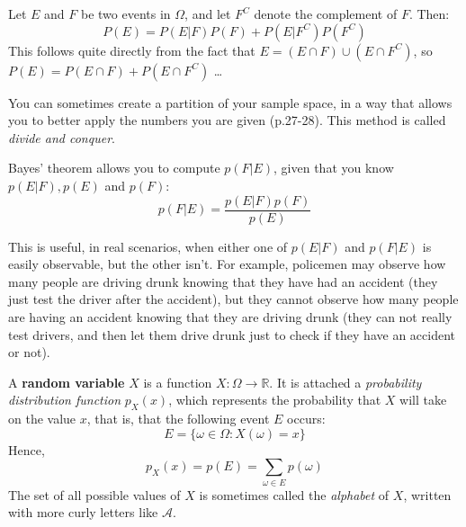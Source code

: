 \documentclass{report}
\begin{document}
\begin{thm}
Let $E$ and $F$ be two events in $\Omega$, and let $F^C$ denote the complement of $F$. Then:
\begin{equation}
	P(E) = P(E|F)P(F) + P(E|F^C)P(F^C)
\end{equation}
This follows quite directly from the fact that $E = (E \cap F) \cup (E \cap F^C)$, so $P(E) = P(E \cap F) + P(E \cap F^C)$ \dots 
\end{thm}

\begin{remark} You can sometimes create a partition of your sample space, in a way that allows you to better apply the numbers you are given (p.27-28). This method is called \emph{divide and conquer}.
\end{remark}

\begin{thm}[Bayes]
Bayes' theorem allows you to compute $p(F|E)$, given that you know $p(E|F), p(E)$ and $p(F)$:
\begin{equation}
	p(F|E) = \dfrac{p(E|F)p(F)}{p(E)}
\end{equation}
\end{thm}

\begin{remark}[application] This is useful, in real scenarios, when either one of $p(E|F)$ and $p(F|E)$ is easily observable, but the other isn't. For example, policemen may observe how many people are driving drunk knowing that they have had an accident (they just test the driver after the accident), but they cannot observe how many people are having an accident knowing that they are driving drunk (they can not really test drivers, and then let them drive drunk just to check if they have an accident or not).
\end{remark}

\begin{defn}
A \textbf{random variable} $X$ is a function $X: \Omega \to \mathbb{R}$. It is attached a \emph{probability distribution function} $p_X(x)$, which represents the probability that $X$ will take on the value $x$, that is, that the following event $E$ occurs:
\begin{equation}
	E = \{\omega \in \Omega : X(\omega) = x\}
\end{equation}
Hence,
\begin{equation}
	p_X(x) = p(E) = \sum_{\omega \in E} p(\omega)
\end{equation}
The set of all possible values of $X$ is sometimes called the \emph{alphabet} of $X$, written with more curly letters like $\mathcal A$.
\end{defn}
\end{document}
